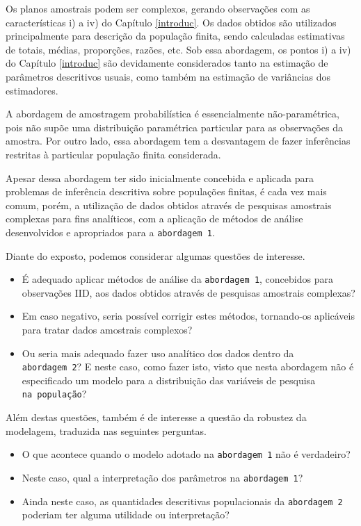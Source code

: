 \documentclass[]{book}
\providecommand{\tightlist}{%
  \setlength{\itemsep}{0pt}\setlength{\parskip}{0pt}}
\theoremstyle{definition}
\theoremstyle{definition}
\theoremstyle{definition}
\theoremstyle{remark}
\begin{document}
Os planos amostrais podem ser complexos, gerando observações com as
características i) a iv) do Capítulo \ref{introduc}. Os dados obtidos
são utilizados principalmente para descrição da população finita, sendo
calculadas estimativas de totais, médias, proporções, razões, etc. Sob
essa abordagem, os pontos i) a iv) do Capítulo \ref{introduc} são
devidamente considerados tanto na estimação de parâmetros descritivos
usuais, como também na estimação de variâncias dos estimadores.

A abordagem de amostragem probabilística é essencialmente
não-paramétrica, pois não supõe uma distribuição paramétrica particular
para as observações da amostra. Por outro lado, essa abordagem tem a
desvantagem de fazer inferências restritas à particular população finita
considerada.

Apesar dessa abordagem ter sido inicialmente concebida e aplicada para
problemas de inferência descritiva sobre populações finitas, é cada vez
mais comum, porém, a utilização de dados obtidos através de pesquisas
amostrais complexas para fins analíticos, com a aplicação de métodos de
análise desenvolvidos e apropriados para a \texttt{abordagem\ 1}.

Diante do exposto, podemos considerar algumas questões de interesse.

\begin{itemize}
\item
  É adequado aplicar métodos de análise da \texttt{abordagem\ 1},
  concebidos para observações IID, aos dados obtidos através de
  pesquisas amostrais complexas?
\item
  Em caso negativo, seria possível corrigir estes métodos, tornando-os
  aplicáveis para tratar dados amostrais complexos?
\item
  Ou seria mais adequado fazer uso analítico dos dados dentro da
  \texttt{abordagem\ 2}? E neste caso, como fazer isto, visto que nesta
  abordagem não é especificado um modelo para a distribuição das
  variáveis de pesquisa \texttt{na\ população}?
\end{itemize}

Além destas questões, também é de interesse a questão da robustez da
modelagem, traduzida nas seguintes perguntas.

\begin{itemize}
\tightlist
\item
  O que acontece quando o modelo adotado na \texttt{abordagem\ 1} não é
  verdadeiro?
\item
  Neste caso, qual a interpretação dos parâmetros na
  \texttt{abordagem\ 1}?
\item
  Ainda neste caso, as quantidades descritivas populacionais da
  \texttt{abordagem\ 2} poderiam ter alguma utilidade ou interpretação?
\end{itemize}
\end{document}
